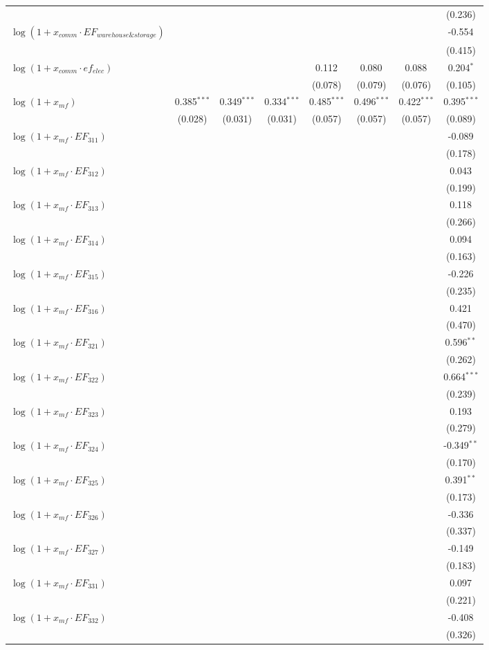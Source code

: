 \begin{longtable}[h]{lccccccc}
  & & & & & & & (0.236) \\
$\log(1 + x_{comm}\cdot EF_{warehouse\&storage})$ & & & & & & & -0.554$^{}$ \\
  & & & & & & & (0.415) \\
$\log(1 + x_{comm}\cdot ef_{elec})$ & & & & 0.112$^{}$ & 0.080$^{}$ & 0.088$^{}$ & 0.204$^{*}$ \\
  & & & & (0.078) & (0.079) & (0.076) & (0.105) \\
$\log(1 + x_{mf})$ & 0.385$^{***}$ & 0.349$^{***}$ & 0.334$^{***}$ & 0.485$^{***}$ & 0.496$^{***}$ & 0.422$^{***}$ & 0.395$^{***}$ \\
  & (0.028) & (0.031) & (0.031) & (0.057) & (0.057) & (0.057) & (0.089) \\
$\log(1 + x_{mf}\cdot EF_{311})$ & & & & & & & -0.089$^{}$ \\
  & & & & & & & (0.178) \\
$\log(1 + x_{mf}\cdot EF_{312})$ & & & & & & & 0.043$^{}$ \\
  & & & & & & & (0.199) \\
$\log(1 + x_{mf}\cdot EF_{313})$ & & & & & & & 0.118$^{}$ \\
  & & & & & & & (0.266) \\
$\log(1 + x_{mf}\cdot EF_{314})$ & & & & & & & 0.094$^{}$ \\
  & & & & & & & (0.163) \\
$\log(1 + x_{mf}\cdot EF_{315})$ & & & & & & & -0.226$^{}$ \\
  & & & & & & & (0.235) \\
$\log(1 + x_{mf}\cdot EF_{316})$ & & & & & & & 0.421$^{}$ \\
  & & & & & & & (0.470) \\
$\log(1 + x_{mf}\cdot EF_{321})$ & & & & & & & 0.596$^{**}$ \\
  & & & & & & & (0.262) \\
$\log(1 + x_{mf}\cdot EF_{322})$ & & & & & & & 0.664$^{***}$ \\
  & & & & & & & (0.239) \\
$\log(1 + x_{mf}\cdot EF_{323})$ & & & & & & & 0.193$^{}$ \\
  & & & & & & & (0.279) \\
$\log(1 + x_{mf}\cdot EF_{324})$ & & & & & & & -0.349$^{**}$ \\
  & & & & & & & (0.170) \\
$\log(1 + x_{mf}\cdot EF_{325})$ & & & & & & & 0.391$^{**}$ \\
  & & & & & & & (0.173) \\
$\log(1 + x_{mf}\cdot EF_{326})$ & & & & & & & -0.336$^{}$ \\
  & & & & & & & (0.337) \\
$\log(1 + x_{mf}\cdot EF_{327})$ & & & & & & & -0.149$^{}$ \\
  & & & & & & & (0.183) \\
$\log(1 + x_{mf}\cdot EF_{331})$ & & & & & & & 0.097$^{}$ \\
  & & & & & & & (0.221) \\
$\log(1 + x_{mf}\cdot EF_{332})$ & & & & & & & -0.408$^{}$ \\
  & & & & & & & (0.326) \\


\end{longtable}
